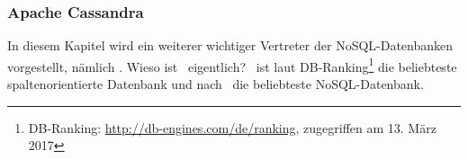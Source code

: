 %
%
%
%
%
%
%
%

\subsubsection{Apache Cassandra}
In diesem Kapitel wird ein weiterer wichtiger Vertreter der NoSQL-Datenbanken vorgestellt, nämlich \cass. Wieso ist \cass\ eigentlich? \cass\ ist laut DB-Ranking\footnote{DB-Ranking: \url{http://db-engines.com/de/ranking}, zugegriffen am 13. März 2017} die beliebteste spaltenorientierte Datenbank und nach \mongo\ die beliebteste NoSQL-Datenbank.

